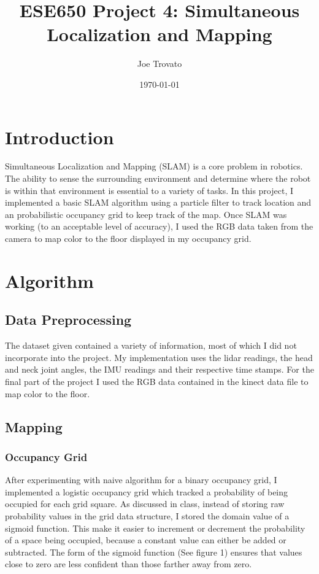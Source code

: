 \documentclass{article}
\begin{document}
\title{ESE650 Project 4: Simultaneous Localization and Mapping}
\author{Joe Trovato}
\date{\today}
\maketitle
\setlength{\parindent}{10ex}

\section{Introduction}
Simultaneous Localization and Mapping (SLAM) is a core problem in robotics. The ability to sense the surrounding environment and determine where the robot is within that environment is essential to a variety of tasks. In this project, I implemented a basic SLAM algorithm using a particle filter to track location and an probabilistic occupancy grid to keep track of the map. Once SLAM was working (to an acceptable level of accuracy), I used the RGB data taken from the camera to map color to the floor displayed in my occupancy grid. 

\section{Algorithm}
\subsection{Data Preprocessing}
The dataset given contained a variety of information, most of which  I did not incorporate into the project. My implementation uses the lidar readings, the head and neck joint angles, the IMU readings and their respective time stamps. For the final part of the project I used the RGB data contained in the kinect data file to map color to the floor. 
 
\subsection{Mapping}

\subsubsection{Occupancy Grid}
After experimenting with naive algorithm for a binary occupancy grid, I implemented a logistic occupancy grid which tracked a probability of being occupied for each grid square. As discussed in class, instead of storing raw probability values in the grid data structure, I stored the domain value of a sigmoid function. This make it easier to increment or decrement the probability of a space being occupied, because a constant value can either be added or subtracted. The form of the sigmoid function (See figure 1) ensures that values close to zero are less confident than those farther away from zero.
\FloatBarrier
\end{document}
